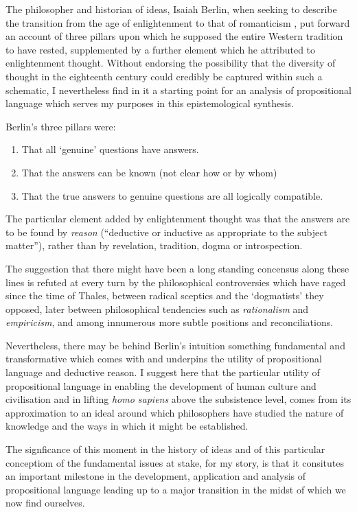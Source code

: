 ﻿
The philosopher and historian of ideas, Isaiah Berlin, when seeking to describe the transition from the age of enlightenment to that of romanticism \cite{berlinRR}, put forward an account of three pillars upon which he supposed the entire Western tradition to have rested, supplemented by a further element which he attributed to enlightenment thought.
Without endorsing the possibility that the diversity of thought in the eighteenth century could credibly be captured within such a schematic, I nevertheless find in it a starting point for an analysis of propositional language which serves my purposes in this epistemological synthesis.

Berlin's three pillars were:

\begin{enumerate}
\item That all `genuine' questions have answers.

\item That the answers can be known (not clear how or by whom)

\item That the true answers to genuine questions are all logically compatible.
\end{enumerate}

The particular element added by enlightenment thought was that the answers are to be found by \emph{reason} (``deductive or inductive as appropriate to the subject matter''), rather than by revelation, tradition, dogma or introspection.

The suggestion that there might have been a long standing concensus along these lines is refuted at every turn by the philosophical controversies which have raged since the time of Thales, between radical sceptics and the `dogmatists' they opposed, later between philosophical tendencies such as \emph{rationalism} and \emph{empiricism}, and among innumerous more subtle positions and reconciliations.

Nevertheless, there may be behind Berlin's intuition something fundamental and transformative which comes with and underpins the utility of propositional language and deductive reason.
I suggest here that the particular utility of propositional language in enabling the development of human culture and civilisation and in lifting \emph{homo sapiens} above the subsistence level, comes from its approximation to an ideal around which philosophers have studied the nature of knowledge and the ways in which it might be established.

The signficance of this moment in the history of ideas and of this particular conceptiom of the fundamental issues at stake, for my story, is that it consitutes an important milestone in the development, application and analysis of propositional language leading up to a major transition in the midst of which we now find ourselves.

